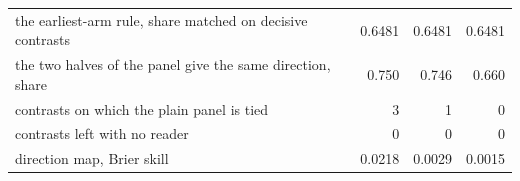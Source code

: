 \begin{tabular}{p{6.6cm}rrr}
the earliest-arm rule, share matched on decisive contrasts & 0.6481 & 0.6481 & 0.6481 \\
the two halves of the panel give the same direction, share & 0.750 & 0.746 & 0.660 \\
contrasts on which the plain panel is tied & 3 & 1 & 0 \\
contrasts left with no reader & 0 & 0 & 0 \\
direction map, Brier skill & 0.0218 & 0.0029 & 0.0015 \\

\end{tabular}

